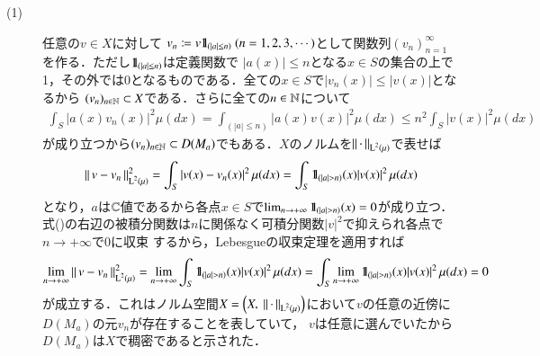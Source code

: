 \begin{prf}
\begin{description}\mbox{}
	\item[(1)] 任意の$v \in X$に対して
		$v_n \coloneqq v\defunc_{(|a| \leq n)}\ (n=1,2,3,\cdots)$として関数列$(v_n)_{n=1}^{\infty}$を作る．ただし$\mbox{1}\hspace{-0.25em}\mbox{l}_{(|a| \leq n)}$は定義関数で
		$|a(x)| \leq n$となる$x \in S$の集合の上で1，その外では0となるものである．全ての$x \in S$で$|v_n(x)| \leq |v(x)|$となるから
		$(v_n)_{n \in \mathbb{N}} \subset X$である．さらに全ての$n \in \mathbb{N}$について
		\begin{align}
			\int_{S} |a(x)v_n(x)|^2 \mu(dx) = \int_{(|a| \leq n)} |a(x)v(x)|^2 \mu(dx) \leq n^2  \int_{S} |v(x)|^2 \mu(dx)
		\end{align}
		が成り立つから$(v_n)_{n \in \mathbb{N}} \subset D(M_a)$でもある．$X$のノルムを$\left\|\, \cdot\, \right\|_{\operatorname{L}^{2} \left(\mu\right)}$で表せば
		\begin{align}
			\left\|\, v - v_n\, \right\|_{\operatorname{L}^{2} \left(\mu\right)}^2 = \int_{S} |v(x) - v_n(x)|^2\, \mu(dx) = \int_{S} \mbox{1}\hspace{-0.25em}\mbox{l}_{(|a| > n)}(x)|v(x)|^2\, \mu(dx)
			\label{eq:func_report_Q9_1}
		\end{align}
		となり，$a$は$\mathbb{C}$値であるから各点$x \in S$で$\lim_{n \to +\infty} \mbox{1}\hspace{-0.25em}\mbox{l}_{(|a| > n)}(x) = 0$が成り立つ．
		式()の右辺の被積分関数は$n$に関係なく可積分関数$|v|^2$で抑えられ各点で$n \to +\infty$で$0$に収束
		するから，Lebesgueの収束定理を適用すれば
		\begin{align}
			\lim_{n \to +\infty} \left\|\, v - v_n\, \right\|_{\operatorname{L}^{2} \left(\mu\right)}^2 
			= \lim_{n \to +\infty} \int_{S} \mbox{1}\hspace{-0.25em}\mbox{l}_{(|a| > n)}(x)|v(x)|^2\, \mu(dx)
			= \int_{S} \lim_{n \to +\infty} \mbox{1}\hspace{-0.25em}\mbox{l}_{(|a| > n)}(x)|v(x)|^2\, \mu(dx)
			= 0
		\end{align}
		が成立する．これはノルム空間$X = \left(X,\ \Norm{\cdot}{\Lp{2}{\mu}}\right)$において$v$の任意の近傍に$D(M_a)$の元$v_n$が存在することを表していて，
		$v$は任意に選んでいたから$D(M_a)$は$X$で稠密であると示された．
		

\end{description}
\end{prf}
